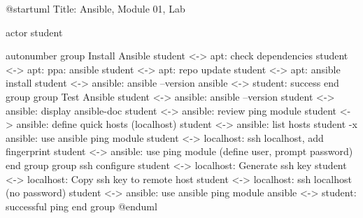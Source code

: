 @startuml
Title: Ansible, Module 01, Lab

actor student

autonumber
group Install Ansible
  student <-> apt: check dependencies
  student <-> apt: ppa: ansible
  student <-> apt: repo update
  student <-> apt: ansible install
  student <-> ansible: ansible --version
  ansible <-> student: success
end group
group Test Ansible
  student <-> ansible: ansible --version
  student <-> ansible: display ansible-doc
  student <-> ansible: review ping module
  student <-> ansible: define quick hosts (localhost)
  student <-> ansible: list hosts
  student -x ansible: use ansible ping module
  student <-> localhost: ssh localhost, add fingerprint
  student <-> ansible: use ping module (define user, prompt password)
end group
group ssh configure
  student <-> localhost: Generate ssh key
  student <-> localhost: Copy ssh key to remote host
  student <-> localhost: ssh localhost (no password)
  student <-> ansible: use ansible ping module
  ansible <-> student: successful ping
end group
@enduml
